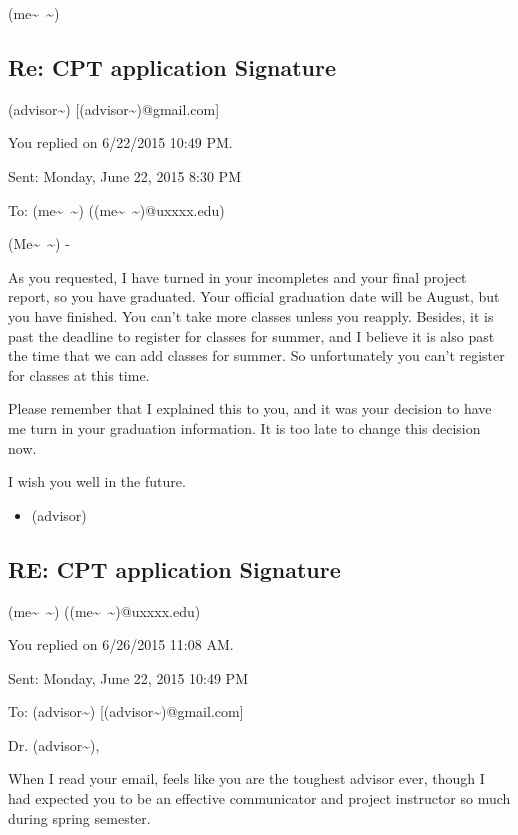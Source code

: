 \documentclass[9pt,b5paper]{article}
\begin{document}
(me\textasciitilde{}~\textasciitilde{})

\subsection{Re: CPT application Signature}
\label{sec-7-7}
(advisor\textasciitilde{}) [(advisor\textasciitilde{})@gmail.com]

You replied on 6/22/2015 10:49 PM.

Sent:        Monday, June 22, 2015 8:30 PM

To:        
(me\textasciitilde{}~\textasciitilde{}) ((me\textasciitilde{}~\textasciitilde{})@uxxxx.edu)

(Me\textasciitilde{}~\textasciitilde{}) -

As you requested, I have turned in your incompletes and your final project report, so you have graduated. Your official graduation date will be August, but you have finished. You can't take more classes unless you reapply. Besides, it is past the deadline to register for classes for summer, and I believe it is also past the time that we can add classes for summer. So unfortunately you can't register for classes at this time.

Please remember that I explained this to you, and it was your decision to have me turn in your graduation information. It is too late to change this decision now.

I wish you well in the future.

\begin{itemize}
\item (advisor)
\end{itemize}

\subsection{RE: CPT application Signature}
\label{sec-7-8}
(me\textasciitilde{}~\textasciitilde{}) ((me\textasciitilde{}~\textasciitilde{})@uxxxx.edu)

You replied on 6/26/2015 11:08 AM.

Sent:        Monday, June 22, 2015 10:49 PM

To:        
(advisor\textasciitilde{}) [(advisor\textasciitilde{})@gmail.com]

Dr. (advisor\textasciitilde{}), 

When I read your email, feels like you are the toughest advisor ever, though I had expected you to be an effective communicator and project instructor so much during spring semester. 
\end{document}
